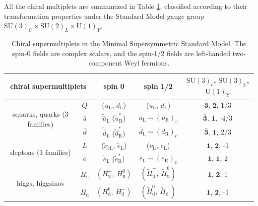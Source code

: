 All the chiral multiplets are summarized in Table \ref{fig:chiral_supermultiplet}, classified according to their transformation properties under the Standard Model gauge group $\text{SU}(3)_{C} \times \text{SU}(2)_{L} \times \text{U}(1)_{Y}$.

\begin{table}[tbh!]
	\centering
	\begin{tabular}{|c || c | c | c | c |}
		\hline
		\multicolumn{2}{|c|}{chiral supermultiplets} & spin 0 & spin 1/2 & $\mathrm{SU}(3)_{\mathrm{c}}$, $\mathrm{SU}(3)_{\mathrm{L}}$, $\mathrm{U}(1)_{\mathrm{Y}}$\\\hline\hline
		\multirow{3}{*}{squarks, quarks (3 families)} &  $Q$  & ($\widetilde{u}_{\mathrm{L}}$, $\widetilde{d}_{\mathrm{L}}$) & ($u_{\mathrm{L}}$, $d_{\mathrm{L}}$) & $\mathbf{3}$, $\mathbf{2}$, 1/3 \\
		& $\bar{u}$ & $\widetilde{\bar{u}}_{\mathrm{L}}$ ($\widetilde{u}_{\mathrm{R}}^*$) & $\bar{u}_{\mathrm{L}} \sim (u_{\mathrm{R}})_{\mathrm{c}}$ & $\bar{\mathbf{{3}}}$, $\mathbf{1}$, -4/3 \\
		& $\bar{d}$ & $\widetilde{\bar{d}}_{\mathrm{L}}$ ($\widetilde{d}_{\mathrm{R}}^*$) & $\bar{d}_{\mathrm{L}} \sim (d_{\mathrm{R}})_{\mathrm{c}}$ & $\bar{\mathbf{3}}$, $\mathbf{1}$, 2/3 \\\hline
		\multirow{2}{*}{sleptons (3 families)} & $L$ & ($\widetilde{\nu}_{e\mathrm{L}}$, $\widetilde{e}_{\mathrm{L}}$) & ($\nu_{\mathrm{L}}$, $e_{\mathrm{L}}$) & $\mathbf{1}$, $\mathbf{2}$, -1 \\
		& $\bar{e}$ & $\widetilde{\bar{e}}_{\mathrm{L}}$ ($\widetilde{e}_{\mathrm{R}}^*$) & $\bar{e}_{\mathrm{L}} \sim (e_{\mathrm{R}})_{\mathrm{c}}$& $\mathbf{1}$, $\mathbf{1}$, 2 \\\hline
		\multirow{2}{*}{higgs, higgsinos} & $H_{\text{u}}$ & $\left(H_{\text{u}}^+,~H_{\text{u}}^0\right)$ & $\left(\widetilde{H}_{\text{u}}^+,~ \widetilde{H}_{\text{u}}^0\right)$ & $\mathbf{1}$, $\mathbf{2}$, 1 \\
		& $H_{\text{d}}$ & $\left(H_{\text{d}}^0,~H_{\text{d}}^-\right)$ & $\left(\widetilde{H}_{\text{d}}^0,~ \widetilde{H}_{\text{d}}^-\right)$ & $\mathbf{1}$, $\mathbf{2}$, -1 \\\hline
	\end{tabular}
	\caption{Chiral supermultiplets in the Minimal Supersymmetric Standard Model. The spin-0
		fields are complex scalars, and the spin-1/2 fields are left-handed two-component Weyl fermions.}
	\label{fig:chiral_supermultiplet}
\end{table}

